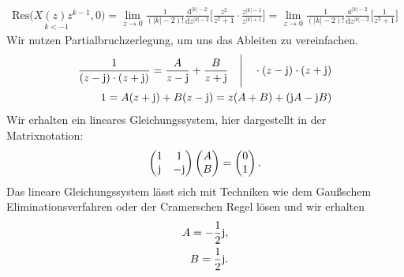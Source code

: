 \documentclass[11pt,a4paper,DIV=12]{scrartcl}
\begin{document}
\begin{align}
	\underset{k<-1}{\mathrm{Res}(X(z)z^{k-1},0})=\lim\limits_{z\rightarrow0}\frac{1}{(|k|-2)!}\frac{\mathrm{d}^{|k|-2}}{\mathrm{d}z^{|k|-2}}\Bigg [\frac{z^2}{z^2+1} \cdot\frac{z^{|k|-1}}{z^{|k|+1}}\Bigg]=\lim\limits_{z\rightarrow0}\frac{1}{(|k|-2)!}\frac{\mathbb{d}^{|k|-2}}{\mathrm{d}z^{|k|-2}}\Bigg [\frac{1}{z^2+1}\Bigg]
\end{align}
Wir nutzen Partialbruchzerlegung, um uns das Ableiten zu vereinfachen.
\begin{align}
	\frac{1}{(z-\im)\cdot(z+\im)}=\frac{A}{z-\im}+\frac{B}{z+\im}\quad\Bigg | \quad \cdot(z-\im)\cdot(z+\im) \nonumber \\
	1=A(z+\im)+B(z-\im)=z(A+B)+(\im A -\im B)
\end{align}
Wir erhalten ein lineares Gleichungssystem, hier dargestellt in der Matrixnotation:
\begin{align}
	\begin{pmatrix}
		1 & 1 \\
		\im & -\im
	\end{pmatrix}
	\begin{pmatrix}
		A \\
		B
	\end{pmatrix}
	=
	\begin{pmatrix}
		0 \\
		1
	\end{pmatrix}.
\end{align}
Das lineare Gleichungssystem lässt sich mit Techniken wie dem Gaußschem Eliminationsverfahren oder der Cramerschen Regel lösen und wir erhalten
\begin{align}
	A= -\frac{1}{2}\im, \nonumber \\
	B = \frac{1}{2}\im.
\end{align}
\end{document}
